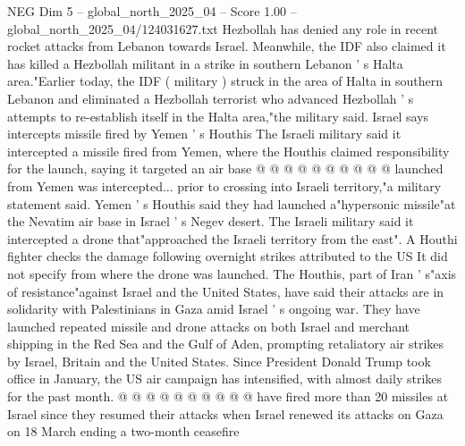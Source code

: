 \begin{textsample}{NEG Dim 5 – global\_north\_2025\_04 – Score 1.00 – global\_north\_2025\_04/124031627.txt}
Hezbollah has denied any role in recent rocket attacks from Lebanon towards Israel.
Meanwhile, the IDF also claimed it has killed a Hezbollah militant in a strike in southern Lebanon ' s Halta area."Earlier today, the IDF ( military ) struck in the area of Halta in southern Lebanon and eliminated a Hezbollah terrorist who advanced Hezbollah ' s attempts to re-establish itself in the Halta area,"the military said.
Israel says intercepts missile fired by Yemen ' s Houthis The Israeli military said it intercepted a missile fired from Yemen, where the Houthis claimed responsibility for the launch, saying it targeted an air base @ @ @ @ @ @ @ @ @ @ launched from Yemen was intercepted... prior to crossing into Israeli territory,"a military statement said.
Yemen ' s Houthis said they had launched a"hypersonic missile"at the Nevatim air base in Israel ' s Negev desert.
The Israeli military said it intercepted a drone that"approached the Israeli territory from the east".
A Houthi fighter checks the damage following overnight strikes attributed to the US It did not specify from where the drone was launched.
The Houthis, part of Iran ' s"axis of resistance"against Israel and the United States, have said their attacks are in solidarity with Palestinians in Gaza amid Israel ' s ongoing war.
They have launched repeated missile and drone attacks on both Israel and merchant shipping in the Red Sea and the Gulf of Aden, prompting retaliatory air strikes by Israel, Britain and the United States.
Since President Donald Trump took office in January, the US air campaign has intensified, with almost daily strikes for the past month. @ @ @ @ @ @ @ @ @ @ have fired more than 20 missiles at Israel since they resumed their attacks when Israel renewed its attacks on Gaza on 18 March ending a two-month ceasefire

\end{textsample}

